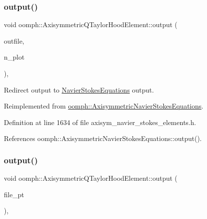\subsubsection{\texorpdfstring{output()}{output()}\hspace{0.1cm}{\footnotesize\ttfamily [2/4]}}
{\footnotesize\ttfamily void oomph\+::\+Axisymmetric\+Q\+Taylor\+Hood\+Element\+::output (\begin{DoxyParamCaption}\item[{std\+::ostream \&}]{outfile,  }\item[{const unsigned \&}]{n\+\_\+plot }\end{DoxyParamCaption})\hspace{0.3cm}{\ttfamily [inline]}, {\ttfamily [virtual]}}



Redirect output to \hyperlink{classoomph_1_1NavierStokesEquations}{Navier\+Stokes\+Equations} output. 



Reimplemented from \hyperlink{classoomph_1_1AxisymmetricNavierStokesEquations_a94a243ca05ba3b995e366564e6cf7695}{oomph\+::\+Axisymmetric\+Navier\+Stokes\+Equations}.



Definition at line 1634 of file axisym\+\_\+navier\+\_\+stokes\+\_\+elements.\+h.



References oomph\+::\+Axisymmetric\+Navier\+Stokes\+Equations\+::output().

\mbox{\label{classoomph_1_1AxisymmetricQTaylorHoodElement_a91861ce04f934aeae956c9d938ce337f}} 
\subsubsection{\texorpdfstring{output()}{output()}\hspace{0.1cm}{\footnotesize\ttfamily [3/4]}}
{\footnotesize\ttfamily void oomph\+::\+Axisymmetric\+Q\+Taylor\+Hood\+Element\+::output (\begin{DoxyParamCaption}\item[{F\+I\+LE $\ast$}]{file\+\_\+pt }\end{DoxyParamCaption})\hspace{0.3cm}{\ttfamily [inline]}, {\ttfamily [virtual]}}



